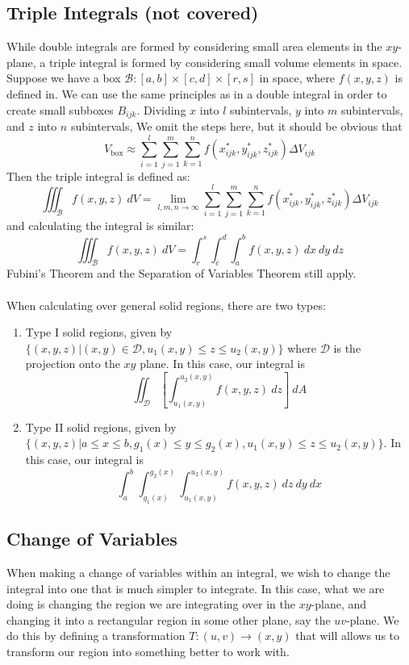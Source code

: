 \documentclass[12pt]{article}
\begin{document}
\subsection{Triple Integrals (not covered)} %
While double integrals are formed by considering small area elements in the $xy$-plane, a triple integral is formed by considering small volume elements in space. Suppose we have a box $\mathcal{B}: [a,b]\times [c,d] \times [r,s]$ in space, where $f(x,y,z)$ is defined in. We can use the same principles as in a double integral in order to create small subboxes $B_{ijk}$. Dividing $x$ into $l$ subintervals, $y$ into $m$ subintervals, and $z$ into $n$ subintervals, We omit the steps here, but it should be obvious that \[ V_{\text{box}} \approx \sum_{i=1}^l\sum_{j=1}^m\sum_{k=1}^nf(x_{ijk}^*,y_{ijk}^*,z_{ijk}^*)\Delta V_{ijk} \]
Then the triple integral is defined as: \[ \iiint_{\mathcal{B}} f(x,y,z) \ dV = \lim_{l,m,n \to \infty}\sum_{i=1}^l\sum_{j=1}^m\sum_{k=1}^nf(x_{ijk}^*,y_{ijk}^*,z_{ijk}^*)\Delta V_{ijk} \]
and calculating the integral is similar: \[ \iiint_{\mathcal{B}} f(x,y,z) \ dV = \int_r^s\int_c^d\int_a^bf(x,y,z) \ dx \ dy \ dz \]
Fubini's Theorem and the Separation of Variables Theorem still apply. \\ \\
When calculating over general solid regions, there are two types:
\begin{enumerate}
\item Type I solid regions, given by $\{(x,y,z)| (x,y) \in \mathcal{D}, u_1(x,y) \le z \le u_2(x,y) \}$ where $\mathcal{D}$ is the projection onto the $xy$ plane. In this case, our integral is \[ \iint_{\mathcal{D}}\left[\int_{u_1(x,y)}^{u_2(x,y)}f(x,y,z) \ dz\right] \ dA \]
\item Type II solid regions, given by $\{(x,y,z)| a \le x \le b, g_1(x) \le y \le g_2(x), u_1(x,y) \le z \le u_2(x,y) \}$. In this case, our integral is \[ \int_a^b\int_{g_1(x)}^{g_2(x)}\int_{u_1(x,y)}^{u_2(x,y)}f(x,y,z) \ dz \ dy \ dx \]
\end{enumerate}

\subsection{Change of Variables}
When making a change of variables within an integral, we wish to change the integral into one that is much simpler to integrate. In this case, what we are doing is changing the region we are integrating over in the $xy$-plane, and changing it into a rectangular region in some other plane, say the $uv$-plane. We do this by defining a transformation $T:(u,v) \to (x,y)$ that will allows us to transform our region into something better to work with. 
\end{document}
